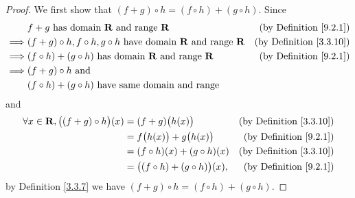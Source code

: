 \begin{proof}
    We first show that \((f + g) \circ h = (f \circ h) + (g \circ h)\).
    Since
    \begin{align*}
                 & f + g \text{ has domain } \mathbf{R} \text{ and range } \mathbf{R}                                   & \text{(by Definition \ref{9.2.1})}  \\
        \implies & (f + g) \circ h, f \circ h, g \circ h  \text{ have domain } \mathbf{R} \text{ and range } \mathbf{R} & \text{(by Definition \ref{3.3.10})} \\
        \implies & (f \circ h) + (g \circ h)  \text{ has domain } \mathbf{R} \text{ and range } \mathbf{R}              & \text{(by Definition \ref{9.2.1})}  \\
        \implies & (f + g) \circ h \text{ and }                                                                                                               \\
                 & (f \circ h) + (g \circ h) \text{ have same domain and range}
    \end{align*}
    and
    \begin{align*}
        \forall x \in \mathbf{R}, \big((f + g) \circ h\big)(x) & = (f + g)\big(h(x)\big)                   & \text{(by Definition \ref{3.3.10})} \\
                                                               & = f\big(h(x)\big) + g\big(h(x)\big)       & \text{(by Definition \ref{9.2.1})}  \\
                                                               & = (f \circ h)(x) + (g \circ h)(x)         & \text{(by Definition \ref{3.3.10})} \\
                                                               & = \big((f \circ h) + (g \circ h)\big)(x), & \text{(by Definition \ref{9.2.1})}
    \end{align*}
    by Definition \ref{3.3.7} we have \((f + g) \circ h = (f \circ h) + (g \circ h)\).


\end{proof}
